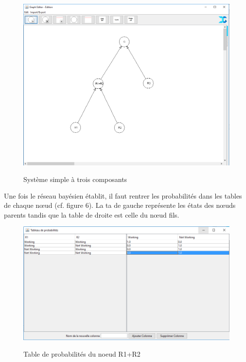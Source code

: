 \documentclass[conference]{IEEEtran}
\begin{document}
\begin{figure}[!h]
\begin{center}
\includegraphics[scale=0.3]{Systeme.png}
\label{fig 5}
\caption{Système simple à trois composants}
\end{center}
\end{figure}

Une fois le réseau bayésien établit, il faut rentrer les probabilités dans les tables de chaque nœud (cf. figure 6). La ta de gauche représente les états des nœuds parents tandis que la table de droite est celle du nœud fils. 

\begin{figure}[!h]
\begin{center}
\includegraphics[scale=0.35]{Table.png}
\label{fig 6}
\caption{Table de probabilités du noeud R1+R2}
\end{center}
\end{figure}
\end{document}
